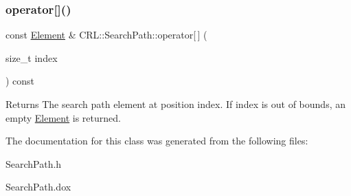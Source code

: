 \subsubsection{\texorpdfstring{operator[]()}{operator[]()}}
{\footnotesize\ttfamily const \hyperlink{classCRL_1_1SearchPath_1_1Element}{Element} \& C\+R\+L\+::\+Search\+Path\+::operator\mbox{[}$\,$\mbox{]} (\begin{DoxyParamCaption}\item[{size\+\_\+t}]{index }\end{DoxyParamCaption}) const}

\begin{DoxyReturn}{Returns}
The search path element at position {\ttfamily index}. If {\ttfamily index} is out of bounds, an empty \hyperlink{classCRL_1_1SearchPath_1_1Element}{Element} is returned. 
\end{DoxyReturn}


The documentation for this class was generated from the following files\+:\begin{DoxyCompactItemize}
\item 
Search\+Path.\+h\item 
Search\+Path.\+dox\end{DoxyCompactItemize}
